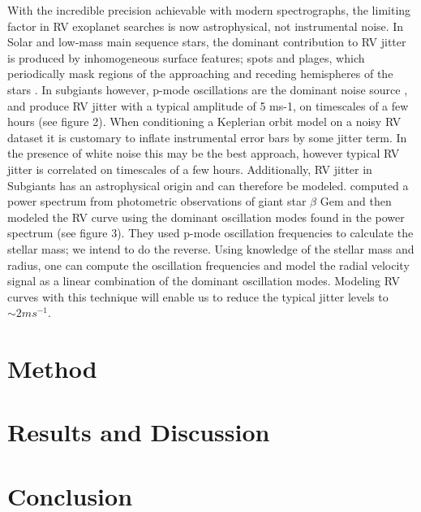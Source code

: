 \documentclass[useAMS, usenatbib]{aastex}
\begin{document}
With the incredible precision achievable with modern spectrographs, the
limiting factor in RV exoplanet searches is now astrophysical, not
instrumental noise.
In Solar and low-mass main sequence stars, the dominant contribution to RV
jitter is produced by inhomogeneous surface features; spots and plages, which
periodically mask regions of the approaching and receding hemispheres of the
stars \citep{Aigrain2012, Dumusque2011, Haywood2014}.
In subgiants however, p-mode oscillations are the dominant noise
source \citep{Hatzes2012}, and produce RV jitter with
a typical amplitude of 5 ms-1, on timescales of a few hours (see figure 2).
When conditioning a Keplerian orbit model on a noisy RV dataset it is
customary to inflate instrumental error bars by some jitter term. In the
presence of white noise this may be the best approach, however typical RV
jitter is correlated on timescales of a few hours.
Additionally, RV jitter in Subgiants has an astrophysical origin and
can therefore be modeled.
\citep{Hatzes2012} computed a power spectrum from photometric observations of
giant star $\beta$ Gem and then modeled the RV curve using the dominant
oscillation modes found in the power spectrum (see figure 3).
They used p-mode oscillation frequencies to calculate the stellar mass; we
intend to do the reverse.
Using knowledge of the stellar mass and radius, one can compute the
oscillation frequencies and model the radial velocity signal as a linear
combination of the dominant oscillation modes.
Modeling RV curves with this technique will enable us to reduce the typical
jitter levels to $\sim 2 ms^{-1}$.

\section{Method}
\label{method}

\section{Results and Discussion}
\label{results}

\section{Conclusion}
\label{conclusion}



\end{document}
